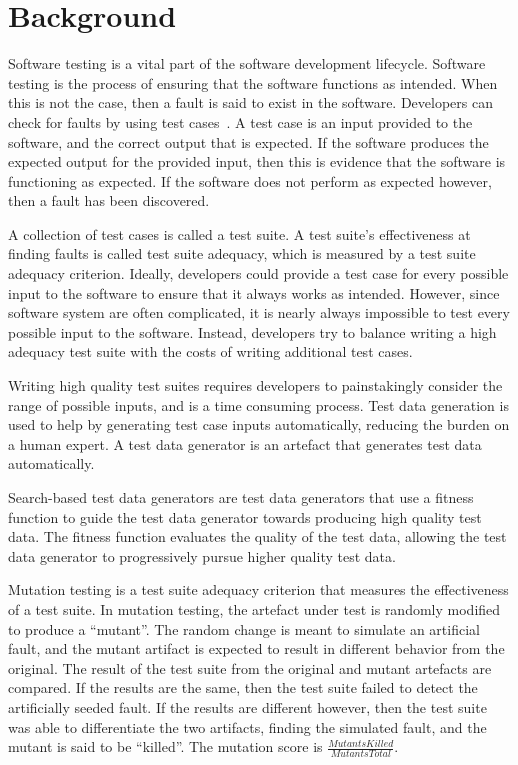 \section{Background}\label{sec:background}
Software testing is a vital part of the software development lifecycle.  Software testing is the
process of ensuring that the software functions as intended.  When this is not the case, then a fault
is said to exist in the software. Developers can check for faults by using test cases~\cite{ammann2008}. A test case is
an input provided to the software, and the correct output that is expected. If the software produces
the expected output for the provided input, then this is evidence that the software is functioning as
expected.  If the software does not perform as expected however, then a fault has been discovered.

A collection of test cases is called a test suite. A test suite's effectiveness at finding faults is
called test suite adequacy, which is measured by a test suite adequacy criterion.
Ideally, developers could provide a test case for every possible input to the software to ensure
that it always works as intended. However, since
software system are often complicated, it is nearly always impossible to test every possible
input to the software. Instead, developers try to balance writing a high adequacy test suite
with the costs of writing additional test cases.

Writing high quality test suites requires developers to painstakingly consider the
range of possible inputs, and is a time consuming process. Test data generation is used to
help by generating test case inputs automatically, reducing the burden on a human expert. A test data
generator is an artefact that generates test data automatically.

Search-based test data generators are test data generators that use a fitness function to guide the
test data generator towards producing high quality test data. The fitness function evaluates the
quality of the test data, allowing the test data generator to progressively pursue higher quality test 
data.

Mutation testing is a test suite adequacy criterion that measures the effectiveness of a test suite. In
mutation testing, the artefact under test is randomly modified to produce a ``mutant''. The random
change is meant to simulate an artificial fault, and the mutant artifact is expected to result in
different behavior from the original. The result of the test suite from the original and mutant
artefacts are compared. If the results are the same, then the test suite failed to detect the
artificially seeded fault. If the results are different however, then the test suite was able to
differentiate the two artifacts, finding the simulated fault, and the mutant is said to be ``killed''.
The mutation score is $\frac{\mathit{MutantsKilled}}{\mathit{MutantsTotal}}$.

